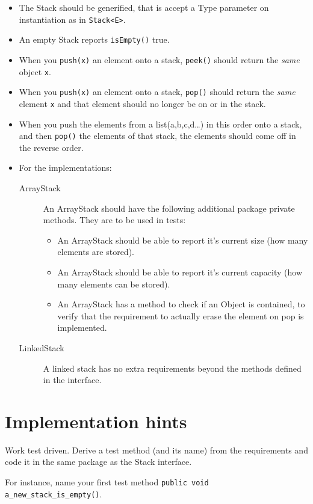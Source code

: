 \documentclass[twocolumn,a4paper]{article}
\providecommand\Code[1]{{\color{fontys}\ttfamily#1}}
\begin{document}
\begin{itemize}
\item The Stack should be generified, that is accept a Type parameter
  on instantiation as in  \lstinline{Stack<E>}.
\item An empty Stack reports \lstinline{isEmpty()} true.
\item When you \lstinline{push(x)} an element onto a stack, \lstinline{peek()} should return the
  \textit{same} object \lstinline{x}.
\item When you \lstinline{push(x)} an element onto a stack,
  \lstinline{pop()} should return the \textit{same} element
  \lstinline{x} and that element should no longer be on or in the stack.
\item When you push the elements from a \Code{list(a,b,c,d\ldots)} in this
  order onto a stack,
  and then \lstinline{pop()} the elements of that stack, the elements should come off in
  the reverse order.
\item For the implementations:
  \begin{description}
  \item[ArrayStack] An \Code{ArrayStack} should have the following
    additional package private methods. They are to be used in tests:
    \begin{itemize}
    \item An ArrayStack should be able to report it's
      current size (how many elements are stored).
    \item An ArrayStack should be able to report it's
      current capacity (how many elements can be stored).
    \item An ArrayStack has a method to check if an Object is contained,
      to verify that the requirement to actually erase the element on
      pop is implemented.
    \end{itemize}
  \item[LinkedStack] A linked stack has no extra requirements beyond
    the methods defined in the interface.
  \end{description}
\end{itemize}

\section*{Implementation hints}
Work test driven. Derive a test method (and its name) from the
requirements and code it in the same package as the Stack interface.

For instance, name your first test method \lstinline{public void a_new_stack_is_empty()}. 
\end{document}
